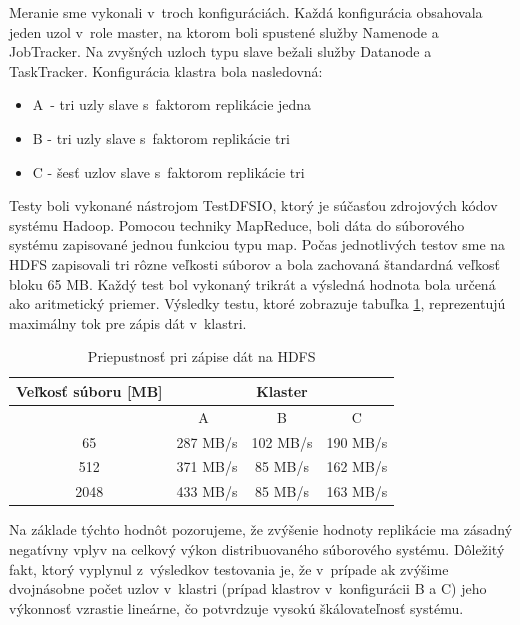 \documentclass[11pt,twoside,a4paper]{book}
\begin{document}
Meranie sme vykonali v~troch konfiguráciách. Každá konfigurácia obsahovala jeden uzol v~role master, na ktorom boli spustené služby Namenode a JobTracker. Na zvyšných uzloch typu slave bežali služby Datanode a TaskTracker. Konfigurácia klastra bola nasledovná:

\begin{itemize}
 \item A~- tri uzly slave s~faktorom replikácie jedna
 \item B - tri uzly slave s~faktorom replikácie tri
 \item C - šesť uzlov slave s~faktorom replikácie tri
\end{itemize}

Testy boli vykonané nástrojom TestDFSIO, ktorý je súčasťou zdrojových kódov systému Hadoop. Pomocou techniky MapReduce, boli dáta do súborového systému zapisované jednou funkciou typu map. Počas jednotlivých testov sme na HDFS zapisovali tri rôzne veľkosti súborov a bola zachovaná štandardná veľkosť bloku 65 MB. Každý test bol vykonaný trikrát a výsledná hodnota bola určená ako aritmetický priemer. Výsledky testu, ktoré zobrazuje tabuľka \ref{tab:HDFSperformance}, reprezentujú maximálny tok pre zápis dát v~klastri.

\begin{table}[hp]
\begin{center}
\begin{tabular}{|c|c|c|c|}
\hline 
\multirow{2}{*}{Veľkosť súboru [MB]} & \multicolumn{3}{|c|}{Klaster}  \\
\hline & A~& B & C\\
\hline 65 & 287 MB/s& 102 MB/s& 190 MB/s\\ 
\hline 512 & 371 MB/s& 85 MB/s& 162 MB/s\\ 
\hline 2048 & 433 MB/s& 85 MB/s& 163 MB/s\\ 
\hline
\end{tabular} 
\end{center}
\caption{Priepustnosť pri zápise dát na HDFS}
\label{tab:HDFSperformance}
\end{table}

% 
% 

Na základe týchto hodnôt pozorujeme, že zvýšenie hodnoty replikácie ma zásadný negatívny vplyv na celkový výkon distribuovaného súborového systému. Dôležitý fakt, ktorý vyplynul z~výsledkov testovania je, že v~prípade ak zvýšime dvojnásobne počet uzlov v~klastri (prípad klastrov v~konfigurácii B a C) jeho výkonnosť vzrastie lineárne, čo potvrdzuje vysokú škálovateľnosť systému. 
\end{document}
